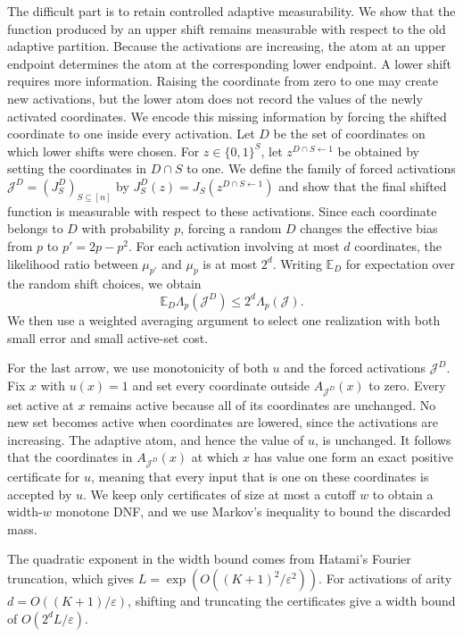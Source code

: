 \documentclass[11pt,letterpaper]{article}
\theoremstyle{definition}
\theoremstyle{remark}
\newcommand{\bits}{\{0,1\}}
\newcommand{\E}{\mathbb E}
\newcommand{\cJ}{\mathcal J}
\begin{document}
The difficult part is to retain controlled adaptive measurability.  We show that
the function produced by an upper shift remains measurable with respect to the
old adaptive partition.  Because the activations are increasing, the atom at
an upper endpoint determines the atom at the corresponding lower endpoint.  A
lower shift requires more information.  Raising the coordinate from zero to
one may create new activations, but the lower atom does not record the values
of the newly activated coordinates.  We encode this missing information by
forcing the shifted coordinate to one inside every activation.  Let $D$ be the
set of coordinates on which lower shifts were chosen.  For $z\in\bits^S$, let
$z^{D\cap S\leftarrow1}$ be obtained
by setting the coordinates in $D\cap S$ to one.  We define the family of
forced activations $\cJ^D=(J_S^D)_{S\subseteq[n]}$ by
$J_S^D(z)=J_S(z^{D\cap S\leftarrow1})$
and show that the final shifted function is measurable with respect to these
activations.
Since each coordinate belongs to $D$ with probability $p$, forcing a random
$D$ changes the effective bias from $p$ to $p'=2p-p^2$.  For each activation
involving at most $d$ coordinates, the likelihood ratio between $\mu_{p'}$ and
$\mu_p$ is at most $2^d$.  Writing $\E_D$ for expectation over the random shift
choices, we obtain
\[
       \E_D\Lambda_p(\cJ^D)\le2^d\Lambda_p(\cJ).
\]
We then use a weighted averaging argument to select one realization with both
small error and small active-set cost.

For the last arrow, we use monotonicity of both $u$ and the forced activations
$\cJ^D$.  Fix $x$ with $u(x)=1$ and set every coordinate outside
$A_{\cJ^D}(x)$ to zero.  Every set active at $x$ remains active because all
of its coordinates are unchanged.  No new set becomes active when coordinates
are lowered, since the activations are increasing.  The adaptive atom, and
hence the value of $u$, is unchanged.  It follows that the coordinates in
$A_{\cJ^D}(x)$ at which $x$ has
value one form an exact positive certificate for $u$, meaning that every input
that is one on these coordinates is accepted by $u$.  We keep only certificates
of size at most a cutoff $w$ to obtain a width-$w$ monotone DNF, and we use
Markov's inequality to bound the discarded mass.

The quadratic exponent in the width bound comes from Hatami's Fourier
truncation, which gives $L=\exp(O((K+1)^2/\varepsilon^2))$.  For activations
of arity $d=O((K+1)/\varepsilon)$, shifting and truncating the certificates
give a width bound of $O(2^d L/\varepsilon)$.
\end{document}
